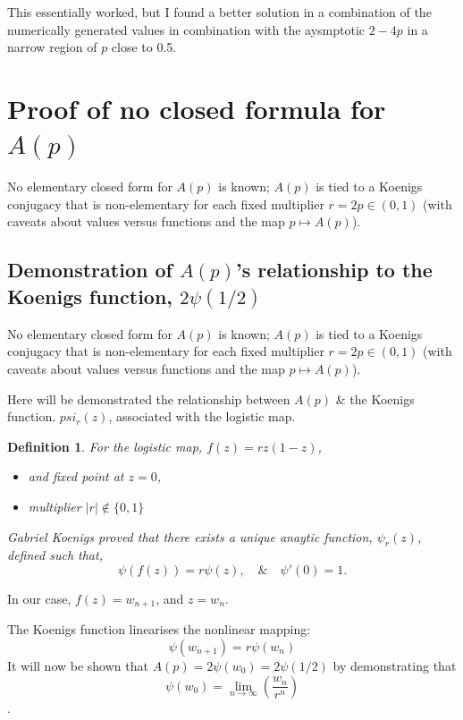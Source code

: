 \documentclass[11pt]{article}
\newtheorem{definition}{Definition}
\begin{document}
\noindent
This essentially worked, but I found a better solution in a combination of the numerically generated values in combination with the aysmptotic $2-4p$ in a narrow region of $p$ close to 0.5.


\section{Proof of no closed formula for $A(p)$}
No elementary closed form for $A(p)$ is known; $A(p)$ is tied to a Koenigs conjugacy that is non-elementary for each fixed multiplier $r=2p\in(0,1)$ (with caveats about values versus functions and the map $p\mapsto A(p)$).


\subsection{Demonstration of $A(p)$'s relationship to the Koenigs function, $2\psi(1/2)$}
No elementary closed form for $A(p)$ is known; $A(p)$ is tied to a Koenigs conjugacy that is non-elementary for each fixed multiplier $r=2p\in(0,1)$ (with caveats about values versus functions and the map $p\mapsto A(p)$).

Here will be demonstrated the relationship between $A(p)$ \& the Koenigs function. $psi_r(z)$, associated with the logistic map.

\begin{definition}
For the logistic map, $f(z) = r z (1-z)$, 
\begin{itemize}
    \item and fixed point at $z=0$,
    \item multiplier $|r| \notin\{0, 1\}$
\end{itemize}
Gabriel Koenigs proved that there exists a unique anaytic function, $\psi_r(z)$, defined such that,
$$\psi(f(z)) = r \psi(z), \quad \& \quad \psi'(0)=1.$$ 
\label{def1}
\end{definition}

In our case, $f(z) = w_{n+1}$, and $z = w_n$.

The Koenigs function linearises the nonlinear mapping:
$$\psi(w_{n+1}) = r \psi(w_n)$$
It will now be shown that $A(p) = 2\psi(w_0) = 2\psi(1/2)$ by demonstrating that
$$\psi(w_0) = \lim_{n\to\infty}\left(\frac{w_n}{r^n}\right)$$.
\end{document}
